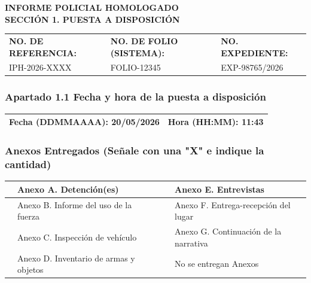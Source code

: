 \documentclass[10pt,letterpaper]{article}
\newcommand{\casilla}{\text{\Large$\square$}}
\newcommand{\NoReferencia}{IPH-2026-XXXX}
\newcommand{\NoFolio}{FOLIO-12345}
\newcommand{\NoExpediente}{EXP-98765/2026}
\newcommand{\FechaPuesta}{20/05/2026}
\newcommand{\HoraPuesta}{11:43}
\begin{document}
\begin{center}
    {\LARGE \textbf{INFORME POLICIAL HOMOLOGADO}} \\
    \vspace{0.2cm}
    {\large \textbf{SECCIÓN 1. PUESTA A DISPOSICIÓN}}
\end{center}

\vspace{0.4cm}

\begin{tabularx}{\textwidth}{|X|X|X|}
\hline
\textbf{NO. DE REFERENCIA:} & \textbf{NO. DE FOLIO (SISTEMA):} & \textbf{NO. EXPEDIENTE:} \\
\NoReferencia & \NoFolio & \NoExpediente \\
\hline
\end{tabularx}

\vspace{0.6cm}

\subsubsection*{Apartado 1.1 Fecha y hora de la puesta a disposición}
\begin{tabularx}{\textwidth}{|X|X|}
\hline
\textbf{Fecha (DDMMAAAA):} \FechaPuesta & \textbf{Hora (HH:MM):} \HoraPuesta \\
\hline
\end{tabularx}

\vspace{0.6cm}

\subsubsection*{Anexos Entregados (Señale con una "X" e indique la cantidad)}
\begin{tabularx}{\textwidth}{|l|X|l|l|X|}
\hline
\casilla & Anexo A. Detención(es) & & \casilla & Anexo E. Entrevistas \\ \hline
\casilla & Anexo B. Informe del uso de la fuerza & & \casilla & Anexo F. Entrega-recepción del lugar \\ \hline
\casilla & Anexo C. Inspección de vehículo & & \casilla & Anexo G. Continuación de la narrativa \\ \hline
\casilla & Anexo D. Inventario de armas y objetos & & \casilla & No se entregan Anexos \\ 
\hline
\end{tabularx}

\vspace{0.6cm}
\end{document}
